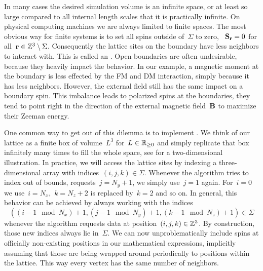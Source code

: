 In many cases the desired simulation volume is an infinite space, or at least so
large compared to all internal length scales that it is practically infinite. On
physical computing machines we are always limited to finite spaces. The most
obvious way for finite systems is to set all spins outside of~$\Sigma$ to zero,
\ie{}~$\mathbf{S}_{\mathbf{r}} = 0$ for all~$\mathbf{r} \in \mathbb{Z}^3 \setminus \Sigma$. Consequently the
lattice sites on the boundary have less neighbors to interact with. This is
called an . Open boundaries are often undesirable,
because they heavily impact the behavior. In our example, a magnetic moment at
the boundary is less effected by the FM and DM interaction, simply because it
has less neighbors. However, the external field still has the same impact on a
boundary spin. This imbalance leads to polarized spins at the boundaries, \ie{}
they tend to point right in the direction of the external magnetic field~$\mathbf{B}$ to
maximize their Zeeman energy.

One common way to get out of this dilemma is to implement . We think of our lattice as a finite box of volume~$L^3$
for~$L\in \mathbb{R}_{\ge 0}$ and simply replicate that box infinitely many times to fill the
whole space, see  for a two-dimensional illustration. In
practice, we will access the lattice sites by indexing a three-dimensional array
with indices~$(i,j,k)\in\Sigma$. Whenever the algorithm tries to index out of
bounds, \eg{} requests~$j=N_y + 1$, we simply use~$j=1$ again. For~$i=0$ we
use~$i=N_x$,~$k=N_z+2$ is replaced by~$k=2$ and so on. In general, this behavior
can be achieved by always working with the indices
%
\begin{equation}\label{periodicindices}
  ((i-1 \mod N_x) + 1, (j-1 \mod N_y) + 1, (k-1 \mod N_z) + 1) \in \Sigma
\end{equation}
%
whenever the algorithm requests data at position~$(i,j,k) \in \mathbb{Z}^3$. By
construction, those new indices always lie in~$\Sigma$. We can now
unproblematically include spins at officially non-existing positions in our
mathematical expressions, implicitly assuming that those are being wrapped
around periodically to positions within the lattice. This way every vertex has
the same number of neighbors.

